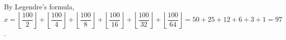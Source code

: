 By Legendre's formula, $x=\left\lfloor\dfrac{100}{2}\right\rfloor+\left\lfloor\dfrac{100}{4}\right\rfloor+\left\lfloor\dfrac{100}{8}\right\rfloor+\left\lfloor\dfrac{100}{16}\right\rfloor+\left\lfloor\dfrac{100}{32}\right\rfloor+\left\lfloor\dfrac{100}{64}\right\rfloor=50+25+12+6+3+1=\boxed{97}$.
